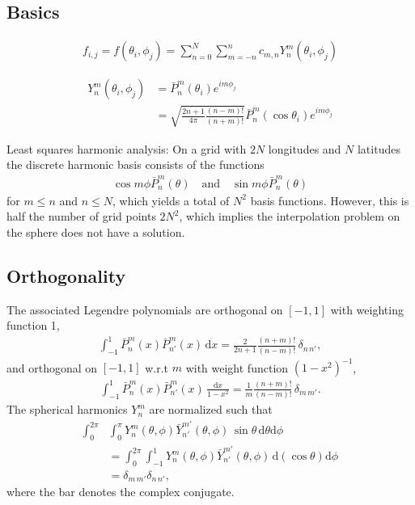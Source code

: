 \documentclass[11pt]{article}
\begin{document}
	
\subsection*{Basics}

\begin{gather}
	f_{i,j} = f(\theta_i,\phi_j)  = \sum_{n=0}^N \sum_{m=-n}^n c_{m,n} Y_n^m (\theta_i,\phi_j) 
\end{gather}

\begin{align}
	Y_n^m (\theta_i, \phi_j) &= \bar{P}_n^m (\theta_i) e^{i m \phi_j} \\
	&= \sqrt{ \frac{2n+1}{4\pi} \frac{(n-m)!}{(n+m)!} } \bar{P}_n^m (\cos \theta_i) e^{i m \phi_j}
\end{align}


Least squares harmonic analysis: On a grid with $2N$ longitudes and $N$ latitudes
the discrete harmonic basis consists of the functions
\begin{gather}
	\cos m \phi \bar{P}_n^m(\theta) \quad \text{and} \quad \sin m \phi \bar{P}_n^m (\theta)
\end{gather}
for $m \le n$ and $n \le N$, which yields a total of $N^2$ basis functions. However,
this is half the number of grid points $2N^2$, which implies the interpolation problem
on the sphere does not have a solution.

\subsection*{Orthogonality}

The associated Legendre polynomials are orthogonal on $[-1,1]$ with weighting function 1,
\begin{gather}
	\int_{-1}^1 \bar{P}_n^m (x) \bar{P}_{n'}^m (x) \, \text{d}x = 
	\frac{2}{2n+1} \frac{ (n+m)! }{ (n-m)! }  \, \delta_{n \, n'},
\end{gather}
and orthogonal on $[-1,1]$ w.r.t $m$ with weight function $(1-x^2)^{-1}$,
\begin{gather}
	\int_{-1}^1 \bar{P}_n^m (x) \bar{P}_{n'}^m (x) \, \frac{\text{d}x}{1-x^2} = 
	\frac{1}{m} \frac{ (n+m)! }{ (n-m)! } \, \delta_{m \, m'}.
\end{gather}
The spherical harmonics $Y_n^m$ are normalized such that
\begin{align*}
	\int_{0}^{2\pi} &\int_{0}^\pi Y_n^m (\theta,\phi) \bar{Y}_{n'}^{m'} (\theta,\phi) \, \sin\theta \, \text{d}\theta \text{d}\phi \\
	&= \int_0^{2\pi} \int_{-1}^1  Y_n^m (\theta,\phi) \bar{Y}_{n'}^{m'} (\theta,\phi) \, \text{d}(\cos \theta) \text{d} \phi \\
	&= \delta_{m \, m'} \delta_{n \, n'},
\end{align*}
where the bar denotes the complex conjugate. \\
\end{document}
